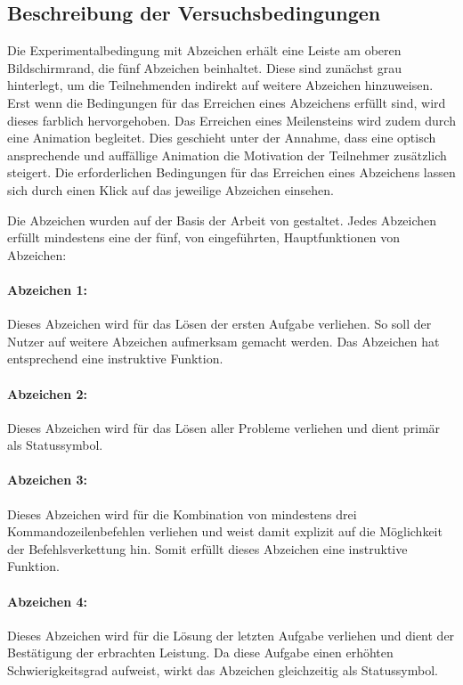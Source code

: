 \subsection{Beschreibung der Versuchsbedingungen}
Die Experimentalbedingung mit Abzeichen erhält eine Leiste am oberen Bildschirmrand, die fünf Abzeichen beinhaltet. Diese sind zunächst grau hinterlegt, um die Teilnehmenden indirekt auf weitere Abzeichen hinzuweisen. Erst wenn die Bedingungen für das Erreichen eines Abzeichens erfüllt sind, wird dieses farblich hervorgehoben. Das Erreichen eines Meilensteins wird zudem durch eine Animation begleitet. Dies geschieht unter der Annahme, dass eine optisch ansprechende und auffällige Animation die Motivation der Teilnehmer zusätzlich steigert. Die erforderlichen Bedingungen für das Erreichen eines Abzeichens lassen sich durch einen Klick auf das jeweilige Abzeichen einsehen.

Die Abzeichen wurden auf der Basis der Arbeit von  gestaltet. Jedes Abzeichen erfüllt mindestens eine der fünf, von  eingeführten, Hauptfunktionen von Abzeichen:

\paragraph{Abzeichen 1:}
Dieses Abzeichen wird für das Lösen der ersten Aufgabe verliehen. So soll der Nutzer auf weitere Abzeichen aufmerksam gemacht werden. Das Abzeichen hat entsprechend eine instruktive Funktion.

\paragraph{Abzeichen 2:}
Dieses Abzeichen wird für das Lösen aller Probleme verliehen und dient primär als Statussymbol.

\paragraph{Abzeichen 3:}
Dieses Abzeichen wird für die Kombination von mindestens drei Kommandozeilenbefehlen verliehen und weist damit explizit auf die Möglichkeit der Befehlsverkettung hin. Somit erfüllt dieses Abzeichen eine instruktive Funktion.

\paragraph{Abzeichen 4:}
Dieses Abzeichen wird für die Lösung der letzten Aufgabe verliehen und dient der Bestätigung der erbrachten Leistung. Da diese Aufgabe einen erhöhten Schwierigkeitsgrad aufweist, wirkt das Abzeichen gleichzeitig als Statussymbol.

